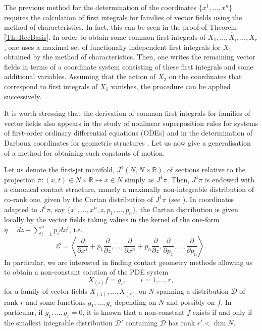 \documentclass[12pt]{article}
\theoremstyle{plain}
\theoremstyle{definition}
\numberwithin{equation}{section}
\begin{document}
The previous method for the determination of the coordinates $\{x^1,\ldots,x^n\}$ requires the calculation of first integrals for families of vector fields using the method of characteristics. In fact, this can be seen in the proof of Theorem \ref{Th::RecBasis}. In order to obtain some common first integrals of $X_1,\ldots,\hat{X}_{i},\ldots, X_r$, one uses a maximal set of functionally independent first integrals for $X_1$ obtained by the method of characteristics. Then, one writes the remaining vector fields in terms of a coordinate system consisting of these first integrals and some additional variables. Assuming that the action of $X_2$ on the coordinates that correspond to first integrals of $X_1$ vanishes, the procedure can be applied successively. 

It is worth stressing that the derivation of common first integrals for families of vector fields also appears in the study of nonlinear superposition rules for systems of first-order ordinary differential equations (ODEs) \cite{CL11} and in the determination of Darboux coordinates for geometric structures \cite{GLRR23}. Let us now give a generalisation of a method for obtaining such constants of motion. 

Let us denote the first-jet manifold, $J^1(N,N\times \mathbb{R})$, of sections relative to the projection $\pi:(x,t)\in N\times \mathbb{R}\mapsto x\in N$ simply as $J^1\pi$. Then, $J^1\pi$ is endowed with a canonical contact structure, namely a maximally non-integrable distribution of co-rank one, given by the Cartan distribution of $J^1\pi$ (see \cite{Ar90}).  In coordinates adapted to $J^1\pi$, say $\{x^1,\ldots,x^n,z,p_1,\ldots,p_n\}$, the Cartan distribution is given locally  by the vector fields taking values in the kernel of the one-form $\eta=dz-\sum_{i=1}^np_idx^i$, i.e.
$$
\mathcal{C
}=\left\langle \frac{\partial}{\partial x^1}+p_1\frac{\partial}{\partial z},\ldots,\frac{\partial}{\partial x^n}+p_n\frac{\partial}{\partial z},\frac{\partial}{\partial p_1},\ldots,\frac{\partial}{\partial p_n}\right\rangle.
$$
In particular, we are interested in finding contact geometry methods allowing us to obtain a non-constant solution of the PDE system
\begin{equation}\label{eq:DifEq}
X_{(i)}f=g_i,\qquad i=1,\ldots,r,
\end{equation}
for a family of vector fields $X_{(1)},\ldots,X_{(r)}$ on $N$ spanning a distribution $\mathcal{D}$ of rank $r$ and some functions $g_1,\ldots,g_r$ depending on $N$ and possibly on $f$. In particular, if $g_1,\ldots,g_r=0$,  it is known that a non-constant $f$ exists if and only if the smallest integrable distribution $\mathcal{D}'$ containing $\mathcal{D}$ 
has rank $r'<\dim N$. 
\end{document}
